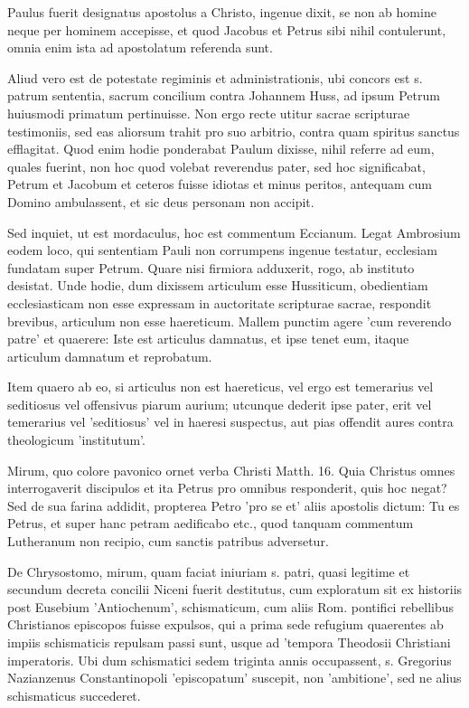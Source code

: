 Paulus fuerit designatus apostolus a Christo, ingenue dixit, se non ab homine neque per hominem accepisse, et quod Jacobus et Petrus sibi nihil contulerunt, omnia enim ista ad apostolatum referenda sunt.

Aliud vero est de potestate regiminis et administrationis, ubi concors est s. patrum sententia, sacrum concilium contra Johannem Huss, ad ipsum Petrum huiusmodi primatum pertinuisse. Non ergo recte utitur sacrae scripturae testimoniis, sed eas aliorsum trahit pro suo arbitrio, contra quam spiritus sanctus efflagitat. Quod enim hodie ponderabat Paulum dixisse, nihil referre ad eum, quales fuerint, non hoc quod volebat reverendus pater, sed hoc significabat, Petrum et Jacobum et ceteros fuisse idiotas et minus peritos, antequam cum Domino ambulassent, et sic deus personam non accipit.

Sed inquiet, ut est mordaculus, hoc est commentum Eccianum. Legat Ambrosium eodem loco, qui sententiam Pauli non corrumpens ingenue testatur, ecclesiam fundatam super Petrum. Quare nisi firmiora adduxerit, rogo, ab instituto desistat. Unde hodie, dum dixissem articulum esse Hussiticum, obedientiam ecclesiasticam non esse expressam in auctoritate scripturae sacrae, respondit brevibus, articulum non esse haereticum. Mallem punctim agere 'cum reverendo patre' et quaerere: Iste est articulus damnatus, et ipse tenet eum, itaque articulum damnatum et reprobatum.

Item quaero ab eo, si articulus non est haereticus, vel ergo est temerarius vel seditiosus vel offensivus piarum aurium; utcunque \marginpar{\small[306]} dederit ipse pater, erit vel temerarius vel 'seditiosus' vel in haeresi suspectus, aut pias offendit aures contra theologicum 'institutum'.

Mirum, quo colore pavonico ornet verba Christi Matth. 16. Quia Christus omnes interrogaverit discipulos et ita Petrus pro omnibus responderit, quis hoc negat? Sed de sua farina addidit, propterea Petro 'pro se et' aliis apostolis dictum: Tu es Petrus, et super hanc petram aedificabo etc., quod tanquam commentum Lutheranum non recipio, cum sanctis patribus adversetur.

De Chrysostomo, mirum, quam faciat iniuriam s. patri, quasi legitime et secundum decreta concilii Niceni fuerit destitutus, cum exploratum sit ex historiis post Eusebium 'Antiochenum', schismaticum, cum aliis Rom. pontifici rebellibus Christianos episcopos fuisse expulsos, qui a prima sede refugium quaerentes ab impiis schismaticis repulsam passi sunt, usque ad 'tempora Theodosii Christiani imperatoris. Ubi dum schismatici sedem triginta annis occupassent, s. Gregorius Nazianzenus Constantinopoli 'episcopatum' suscepit, non 'ambitione', sed ne alius schismaticus succederet.

